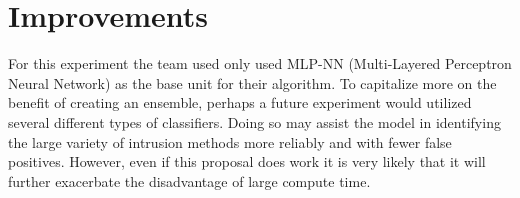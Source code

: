 \documentclass[]{article}
\begin{document}
\section{Improvements}

For this experiment the team used only used MLP-NN (Multi-Layered Perceptron Neural Network) as the base unit for their algorithm. 
To capitalize more on the benefit of creating an ensemble, perhaps a future experiment would utilized several different types of classifiers.
Doing so may assist the model in identifying the large variety of intrusion methods more reliably and with fewer false positives.
However, even if this proposal does work it is very likely that it will further exacerbate the disadvantage of large compute time.

\clearpage


\end{document}
